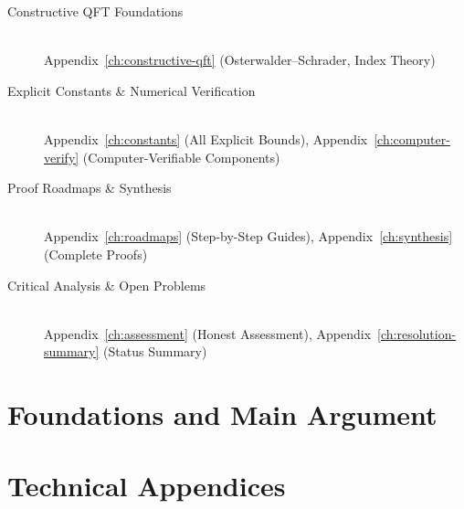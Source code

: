 \documentclass[11pt,a4paper]{report}
\begin{document}
\begin{description}
\item[Constructive QFT Foundations] \hfill \\
  Appendix~\ref{ch:constructive-qft} (Osterwalder--Schrader, Index Theory)

\item[Explicit Constants \& Numerical Verification] \hfill \\
  Appendix~\ref{ch:constants} (All Explicit Bounds),
  Appendix~\ref{ch:computer-verify} (Computer-Verifiable Components)

\item[Proof Roadmaps \& Synthesis] \hfill \\
  Appendix~\ref{ch:roadmaps} (Step-by-Step Guides),
  Appendix~\ref{ch:synthesis} (Complete Proofs)

\item[Critical Analysis \& Open Problems] \hfill \\
  Appendix~\ref{ch:assessment} (Honest Assessment),
  Appendix~\ref{ch:resolution-summary} (Status Summary)
\end{description}

\newpage

\part{Foundations and Main Argument}









\part{Technical Appendices}
\appendix
\renewcommand{\thechapter}{\AlphAlph{\value{chapter}}}


\end{document}
